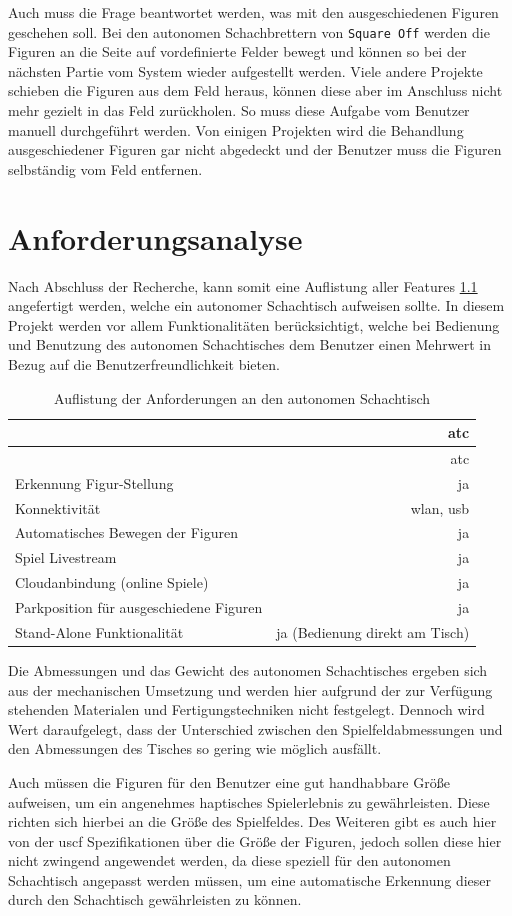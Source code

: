 Auch muss die Frage beantwortet werden, was mit den ausgeschiedenen
Figuren geschehen soll. Bei den autonomen Schachbrettern von
\passthrough{\lstinline!Square Off!} werden die Figuren an die Seite auf
vordefinierte Felder bewegt und können so bei der nächsten Partie vom
System wieder aufgestellt werden. Viele andere Projekte schieben die
Figuren aus dem Feld heraus, können diese aber im Anschluss nicht mehr
gezielt in das Feld zurückholen. So muss diese Aufgabe vom Benutzer
manuell durchgeführt werden. Von einigen Projekten wird die Behandlung
ausgeschiedener Figuren gar nicht abgedeckt und der Benutzer muss die
Figuren selbständig vom Feld entfernen.

\hypertarget{anforderungsanalyse}{%
\chapter{Anforderungsanalyse}\label{anforderungsanalyse}}

Nach Abschluss der Recherche, kann somit eine Auflistung aller Features
\ref{atcrequirements} angefertigt werden, welche ein autonomer
Schachtisch aufweisen sollte. In diesem Projekt werden vor allem
Funktionalitäten berücksichtigt, welche bei Bedienung und Benutzung des
autonomen Schachtisches dem Benutzer einen Mehrwert in Bezug auf die
Benutzerfreundlichkeit bieten.

\begin{longtable}[]{@{}lr@{}}
\caption{Auflistung der Anforderungen an den autonomen Schachtisch
\label{atcrequirements}}\tabularnewline
\toprule
& \gls{atc}\tabularnewline
\midrule
\endfirsthead
\toprule
& \gls{atc}\tabularnewline
\midrule
\endhead
Erkennung Figur-Stellung & ja\tabularnewline
Konnektivität & \gls{wlan}, \gls{usb}\tabularnewline
Automatisches Bewegen der Figuren & ja\tabularnewline
Spiel Livestream & ja\tabularnewline
Cloudanbindung (online Spiele) & ja\tabularnewline
Parkposition für ausgeschiedene Figuren & ja\tabularnewline
Stand-Alone Funktionalität & ja (Bedienung direkt am
Tisch)\tabularnewline
\bottomrule
\end{longtable}

Die Abmessungen und das Gewicht des autonomen Schachtisches ergeben sich
aus der mechanischen Umsetzung und werden hier aufgrund der zur
Verfügung stehenden Materialen und Fertigungstechniken nicht festgelegt.
Dennoch wird Wert daraufgelegt, dass der Unterschied zwischen den
Spielfeldabmessungen und den Abmessungen des Tisches so gering wie
möglich ausfällt.

Auch müssen die Figuren für den Benutzer eine gut handhabbare Größe
aufweisen, um ein angenehmes haptisches Spielerlebnis zu gewährleisten.
Diese richten sich hierbei an die Größe des Spielfeldes. Des Weiteren
gibt es auch hier von der \gls{uscf}\cite{officialuscfrules}
Spezifikationen über die Größe der Figuren, jedoch sollen diese hier
nicht zwingend angewendet werden, da diese speziell für den autonomen
Schachtisch angepasst werden müssen, um eine automatische Erkennung
dieser durch den Schachtisch gewährleisten zu können.

